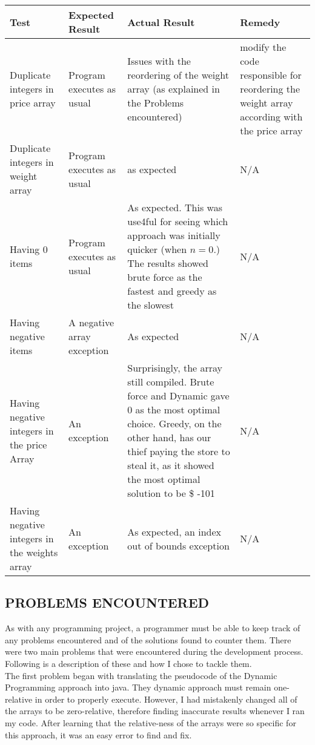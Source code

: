 \documentclass[12pt]{article}
\begin{document}
	
	\begin{tabular}{|p{3.5cm}|p{3.5cm}|p{3.5cm}|p{3.5cm}|}
		\hline
		Test & Expected Result & Actual Result & Remedy\\
		\hline
        Duplicate integers in price array & Program executes as usual& Issues with the reordering of the weight array (as explained in the Problems encountered) & modify the code responsible for reordering the weight array according with the price array\\
        \hline
        Duplicate integers in weight array&Program executes as usual & as expected 	& N/A\\
        \hline
        Having 0 items &Program executes as usual& As expected. This was use4ful for seeing which approach was initially quicker (when $n = 0$.) The results showed brute force as the fastest and greedy as the slowest& N/A\\
        \hline
        Having negative items& A negative array exception& As expected & N/A\\
        \hline
        Having negative integers in the price Array& An exception & Surprisingly, the array still compiled. Brute force and Dynamic gave 0 as the most optimal choice. Greedy, on the other hand, has our thief paying the store to steal it, as it showed the most optimal solution to be \$ -101 & N/A \\
        \hline
        Having negative integers in the weights array& An exception & As expected, an index out of bounds exception & N/A\\
        \hline
		
	
	\end{tabular}\newpage
	
	\subsection*{PROBLEMS ENCOUNTERED}
	
	As with any programming project, a programmer must be able to keep track of any problems encountered and of the solutions found to counter them. There were two main problems that were encountered during the development process. Following is a description of these and how I chose to tackle them. \\
    
The first problem began with translating the pseudocode of the Dynamic Programming approach into java. They dynamic approach must remain one-relative in order to properly execute. However, I had mistakenly changed all of the arrays to be zero-relative, therefore finding inaccurate results whenever I ran my code. After learning that the relative-ness of the arrays were so specific for this approach, it was an easy error to find and fix. \\
\end{document}
